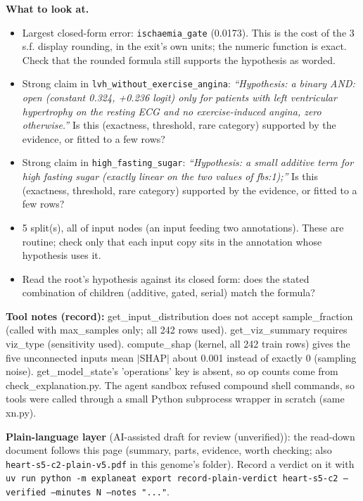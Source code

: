 \documentclass[a4paper,11pt]{article}
\begin{document}
\textbf{What to look at.}
\begin{itemize}
\item Largest closed-form error: \texttt{ischaemia\_\allowbreak{}gate} (0.0173). This is the cost of the 3 s.f. display rounding, in the exit's own units; the numeric function is exact. Check that the rounded formula still supports the hypothesis as worded.
\item Strong claim in \texttt{lvh\_\allowbreak{}without\_\allowbreak{}exercise\_\allowbreak{}angina}: \emph{``Hypothesis: a binary AND: open (constant 0.324, +0.236 logit) only for patients with left ventricular hypertrophy on the resting ECG and no exercise-induced angina, zero otherwise.''} Is this (exactness, threshold, rare category) supported by the evidence, or fitted to a few rows?
\item Strong claim in \texttt{high\_\allowbreak{}fasting\_\allowbreak{}sugar}: \emph{``Hypothesis: a small additive term for high fasting sugar (exactly linear on the two values of fbs:1);''} Is this (exactness, threshold, rare category) supported by the evidence, or fitted to a few rows?
\item 5 split(s), all of input nodes (an input feeding two annotations). These are routine; check only that each input copy sits in the annotation whose hypothesis uses it.
\item Read the root's hypothesis against its closed form: does the stated combination of children (additive, gated, serial) match the formula?
\end{itemize}
\textbf{Tool notes (record):} get\_\allowbreak{}input\_\allowbreak{}distribution does not accept sample\_\allowbreak{}fraction (called with max\_\allowbreak{}samples only; all 242 rows used). get\_\allowbreak{}viz\_\allowbreak{}summary requires viz\_\allowbreak{}type (sensitivity used). compute\_\allowbreak{}shap (kernel, all 242 train rows) gives the five unconnected inputs mean $|$SHAP$|$ about 0.001 instead of exactly 0 (sampling noise). get\_\allowbreak{}model\_\allowbreak{}state's 'operations' key is absent, so op counts come from check\_\allowbreak{}explanation.py. The agent sandbox refused compound shell commands, so tools were called through a small Python subprocess wrapper in scratch (same xn.py).

\textbf{Plain-language layer} (AI-assisted draft for review (unverified)): the read-down document follows this page (summary, parts, evidence, worth checking; also \texttt{heart-s5-c2-plain-v5.pdf} in this genome's folder). Record a verdict on it with \texttt{uv run python -m explaneat export record-plain-verdict heart-s5-c2 --verified --minutes N --notes "..."}.
\end{document}

